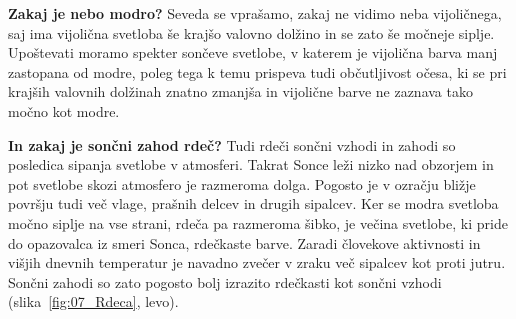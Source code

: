 \begin{example}{\bf Zakaj je nebo modro?}
Seveda se vprašamo, zakaj ne vidimo neba vijoličnega, saj 
ima vijolična svetloba še krajšo valovno dolžino in se zato še močneje siplje. Upoštevati 
moramo spekter sončeve svetlobe, v katerem je vijolična barva manj zastopana od modre, poleg
tega k temu prispeva tudi občutljivost očesa, ki se pri krajših valovnih dolžinah znatno 
zmanjša in vijolične barve ne zaznava tako močno kot modre. 
\end{example}

\begin{example}{\bf In zakaj je sončni zahod rdeč?}
Tudi rdeči sončni vzhodi in zahodi so posledica sipanja svetlobe v atmosferi. 
Takrat Sonce leži nizko nad obzorjem in pot svetlobe skozi atmosfero je 
razmeroma dolga. Pogosto je v ozračju bližje površju tudi več vlage, prašnih delcev
in drugih sipalcev. Ker se modra svetloba močno siplje na vse strani, rdeča
pa razmeroma šibko, je večina svetlobe, ki pride do opazovalca iz smeri Sonca,
rdečkaste barve. Zaradi človekove aktivnosti in višjih dnevnih temperatur je 
navadno zvečer v zraku več sipalcev kot proti jutru. Sončni zahodi so zato pogosto
bolj izrazito rdečkasti kot sončni vzhodi (slika~\ref{fig:07_Rdeca}, levo).
\end{example}
